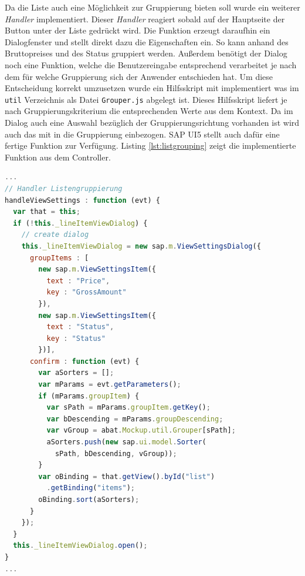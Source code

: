 Da die Liste auch eine Möglichkeit zur Gruppierung bieten soll wurde ein weiterer \textit{Handler} implementiert. Dieser \textit{Handler} reagiert sobald auf der Hauptseite der Button unter der Liste gedrückt wird. Die Funktion erzeugt daraufhin ein Dialogfenster und stellt direkt dazu die Eigenschaften ein. So kann anhand des Bruttopreises und des Status gruppiert werden. Außerdem benötigt der Dialog noch eine Funktion, welche die Benutzereingabe entsprechend verarbeitet je nach dem für welche Gruppierung sich der Anwender entschieden hat. Um diese Entscheidung korrekt umzusetzen wurde ein Hilfsskript mit implementiert was im \texttt{util} Verzeichnis als Datei \texttt{Grouper.js} abgelegt ist. Dieses Hilfsskript liefert je nach Gruppierungskriterium die entsprechenden Werte aus dem Kontext. Da im Dialog auch eine Auswahl bezüglich der Gruppierungsrichtung vorhanden ist wird auch das mit in die Gruppierung einbezogen. SAP UI5 stellt auch dafür eine fertige Funktion zur Verfügung. Listing \ref{lst:listgrouping} zeigt die implementierte Funktion aus dem Controller.

\vspace{1em}
\begin{lstlisting}[language=JavaScript, caption=Handler der Listengruppierung, label=lst:listgrouping]
...
// Handler Listengruppierung
handleViewSettings : function (evt) {
  var that = this;
  if (!this._lineItemViewDialog) {
    // create dialog
    this._lineItemViewDialog = new sap.m.ViewSettingsDialog({
      groupItems : [
        new sap.m.ViewSettingsItem({
          text : "Price",
          key : "GrossAmount"
        }),
        new sap.m.ViewSettingsItem({
          text : "Status",
          key : "Status"
        })],
      confirm : function (evt) {
        var aSorters = [];
        var mParams = evt.getParameters();
        if (mParams.groupItem) {
          var sPath = mParams.groupItem.getKey();
          var bDescending = mParams.groupDescending;
       	  var vGroup = abat.Mockup.util.Grouper[sPath];
       	  aSorters.push(new sap.ui.model.Sorter(
       	    sPath, bDescending, vGroup));
        }
        var oBinding = that.getView().byId("list")
          .getBinding("items");
        oBinding.sort(aSorters);
      }
    });
  }
  this._lineItemViewDialog.open();
}
...
\end{lstlisting}


